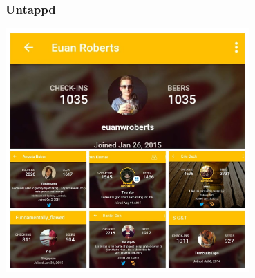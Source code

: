 \documentclass[12pt]{beamer}
\begin{document}
    \begin{frame}
        \frametitle{Untappd}
        \includegraphics[height=0.80\textheight,width=0.7\textwidth]{img/untappd.jpg}
    \end{frame}
\end{document}
